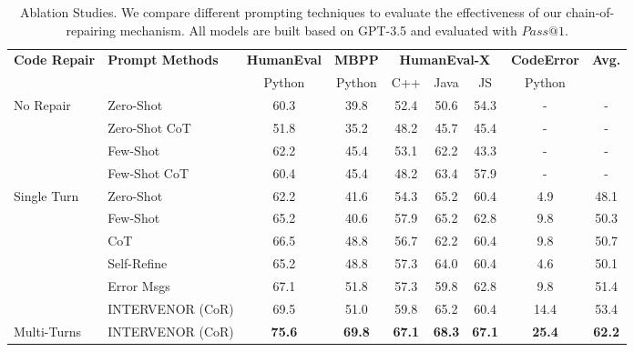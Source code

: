 \documentclass[11pt]{article}
\begin{document}
\begin{table*}[]
\centering
\small
\caption{Ablation Studies. We compare different prompting techniques to evaluate the effectiveness of our chain-of-repairing mechanism. All models are built based on GPT-3.5 and evaluated with $Pass@1$.}
\label{tab:prompt_tec}
\begin{tabular}{l|l|c|c|ccc|c|c}
\hline
\multirow{2}{*}{\textbf{Code Repair}} & \multirow{2}{*}{\textbf{Prompt Methods}} & \textbf{HumanEval} & \textbf{MBPP} & \multicolumn{3}{c|}{\textbf{HumanEval-X}} & \multicolumn{1}{l|}{\textbf{CodeError}} & \multirow{2}{*}{\textbf{Avg.}} \\
                          &       & Python             & Python        & C++        & Java       & JS      & Python                                  &                                   \\ \hline
\multirow{4}{*}{No Repair} & Zero-Shot            & 60.3               & 39.8          & 52.4       & 50.6       & 54.3            & -                                    & -                            \\
& Zero-Shot CoT          & 51.8               & 35.2          & 48.2       & 45.7       & 45.4            & -                                     & -                                 \\
&Few-Shot               & 62.2               & 45.4          & 53.1       & 62.2       & 43.3            & -                                     & -                             \\
& Few-Shot CoT                    & 60.4               & 45.4          & 48.2       & 63.4       & 57.9            & -                                     & -                              \\ \hline
\multirow{6}{*}{Single Turn} & Zero-Shot &62.2&41.6&54.3&65.2&60.4&4.9&48.1\\
 & Few-Shot &65.2&40.6&57.9&65.2&62.8&9.8&50.3\\
& CoT &66.5&48.8&56.7&62.2&60.4&9.8&50.7\\


& Self-Refine       & 65.2                  & 48.8             & 57.3          & 64.0          & 60.4              & 4.6                                     & 50.1                                 \\
& Error Msgs        & 67.1               & 51.8          & 57.3       & 59.8       & 62.8            & 9.8                                     & 51.4                              \\
& INTERVENOR (CoR)     & 69.5                  & 51.0             & 59.8          & 65.2          & 60.4              & 14.4                                     & 53.4                                 \\\hline
Multi-Turns & INTERVENOR  (CoR)                     & \textbf{75.6}               & \textbf{69.8}          & \textbf{67.1}       & \textbf{68.3}       & \textbf{67.1}            & \textbf{25.4}                                      & \textbf{62.2}                              \\ 
\hline
\end{tabular}
\end{table*}
\end{document}
